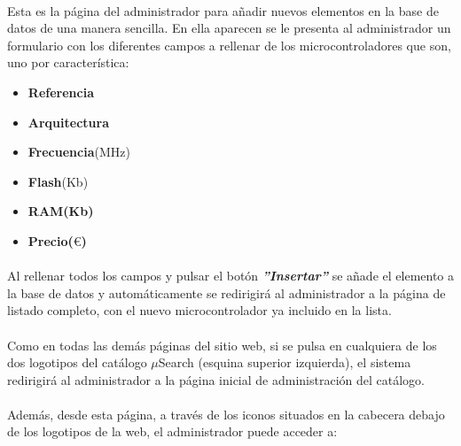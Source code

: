\paragraph{} Esta es la página del administrador para añadir nuevos elementos en la base de datos de una manera sencilla. En ella aparecen se le presenta al administrador un formulario con los diferentes campos a rellenar de los microcontroladores que son, uno por característica:
\begin{itemize}
\item \textbf{Referencia}
\item \textbf{Arquitectura}
\item \textbf{Frecuencia}(MHz) 
\item \textbf{Flash}(Kb)
\item \textbf{RAM(Kb)} 
\item \textbf{Precio($\euro$)}
\end{itemize}

\paragraph{} Al rellenar todos los campos y pulsar el botón \textbf{\textit{''Insertar''}} se añade el elemento a la base de datos y automáticamente se redirigirá al administrador a la página de listado completo, con el nuevo microcontrolador ya incluido en la lista.

\paragraph{}Como en todas las demás páginas del sitio web, si se pulsa en cualquiera de los dos logotipos del catálogo $\mu$Search (esquina superior izquierda), el sistema redirigirá al administrador a la página inicial de administración del catálogo.

\paragraph{}Además, desde esta página, a través de los iconos situados en la cabecera debajo de los logotipos de la web, el administrador puede acceder a:

